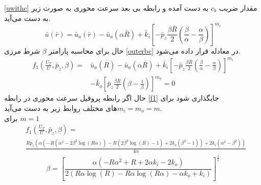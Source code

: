 \ref{uwithc}
مقدار ضریب $c_b$ به دست آمده و رابطه بی بعد سرعت محوری به صورت زیر به دست می‌آید.
\begin{equation}
	\label{27}
	\bar{u}(\bar{r})=\bar{u}_{a}(\bar{r})-\bar{u}_{a}(\alpha \bar{R})+\bar{k}_{i}\left[-\bar{p}_{z} \frac{\beta \bar{R}}{2}\left(\frac{\beta}{\alpha}-\frac{\alpha}{\beta}\right)\right]^{m_{i}}
\end{equation}
حال برای محاسبه پارامتر $\beta$ شرط مرزی
\ref{outerbc}
در معادله قرار داده می‌شود.
\begin{equation}
	\label{f1}
	\begin{aligned}
		f_{1}\left(\frac{U_{T}}{U}, \bar{p}_{z}, \beta\right) =  &  \bar{u}_{a}(\bar{R})-\bar{u}_{a}(\alpha \bar{R})+\bar{k}_{i}\left[-\bar{p}_{z} \frac{\beta \bar{R}}{2}\left(\frac{\beta}{\alpha}-\frac{\alpha}{\beta}\right)\right]^{m_{i}} \\
		&-\bar{k}_{o}\left[\bar{p}_{z} \frac{\beta \bar{R}}{2}\left(\beta-\frac{1}{\beta}\right)\right]^{m_{o}}=0
	\end{aligned}
\end{equation}
حال اگر رابطه پروفیل سرعت محوری در رابطه
\ref{f1}
جایگذاری شود برای  $m_i=m_o= m$‌های مختلف روابط زیر به دست می‌آید.
\\
برای $ m = 1$
\begin{equation}
	\begin{aligned}
		\label{f1_1}
		&f_{1}\left(\frac{U_{T}}{U}, \bar{p}_{z}, \beta\right) =\\
		&\frac{R p_{z} \left(\alpha \left(- R \left(\alpha^{2} - 2 \beta^{2} \log{\left(R \alpha \right)}\right) - R \left(2 \beta^{2} \log{\left(R \right)} - 1\right) + 2 k_{o} \left(\beta^{2} - 1\right)\right) + 2 k_{i} \left(\alpha^{2} - \beta^{2}\right)\right)}{4 \alpha}
	\end{aligned}	
\end{equation}
\begin{equation}
	\beta = \left[\frac{\alpha \left(- R \alpha^{2} + R + 2 \alpha k_{i} - 2 k_{o}\right)}{2 \left(R \alpha \log{\left(R \right)} - R \alpha \log{\left(R \alpha \right)} - \alpha k_{o} + k_{i}\right)}\right]^\frac{1}{2}
\end{equation}

